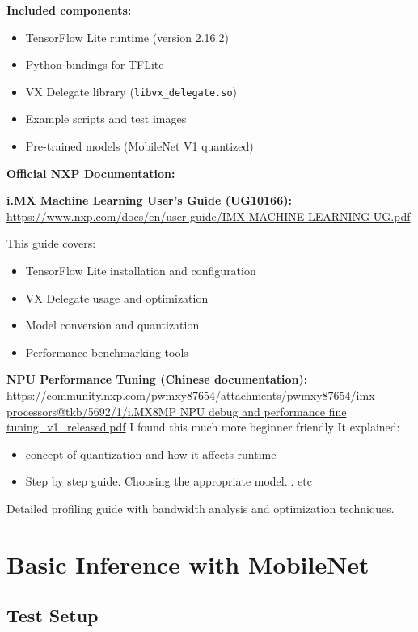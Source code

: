 \documentclass[12pt,a4paper]{report}
\begin{document}
\textbf{Included components:}
\begin{itemize}
    \item TensorFlow Lite runtime (version 2.16.2)
    \item Python bindings for TFLite
    \item VX Delegate library (\texttt{libvx\_delegate.so})
    \item Example scripts and test images
    \item Pre-trained models (MobileNet V1 quantized)
\end{itemize}

\begin{docref}
\textbf{Official NXP Documentation:}

\textbf{i.MX Machine Learning User's Guide (UG10166):}
\url{https://www.nxp.com/docs/en/user-guide/IMX-MACHINE-LEARNING-UG.pdf}

This guide covers:
\begin{itemize}
    \item TensorFlow Lite installation and configuration
    \item VX Delegate usage and optimization
    \item Model conversion and quantization
    \item Performance benchmarking tools
\end{itemize}

\textbf{NPU Performance Tuning (Chinese documentation):}
\url{https://community.nxp.com/pwmxy87654/attachments/pwmxy87654/imx-processors@tkb/5692/1/i.MX8MP NPU debug and performance fine tuning_v1_released.pdf}
I found this much more beginner friendly
It explained: 
\begin{itemize}
    \item concept of quantization and how it affects runtime 
    \item Step by step guide. Choosing the appropriate model... etc
\end{itemize}



Detailed profiling guide with bandwidth analysis and optimization techniques.
\end{docref}

\section{Basic Inference with MobileNet}

\subsection{Test Setup}
\end{document}
